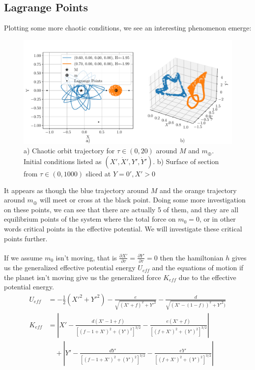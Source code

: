 \documentclass[11pt]{article}
\begin{document}
\subsection{Lagrange Points}
Plotting some more chaotic conditions, we see an interesting phenomenon emerge:
\begin{figure}[H]
    \centering
    \includegraphics[width=0.9\linewidth]{figures/chaotic_investigation_orbit.pdf}
    \caption{a) Chaotic orbit trajectory for $\tau \in (0, 20)$ around $M$ and $m_\oplus$. Initial conditions listed as $(X', \dot X', Y', \dot Y')$. b) Surface of section from $\tau \in (0, 1000)$ sliced at $Y=0', X'>0$}
    \label{fig:chaotic-investigation}
\end{figure}
\noindent
It appears as though the blue trajectory around $M$ and the orange trajectory around $m_\oplus$  will meet or cross at the black point. Doing some more investigation on these points, we can see that there are actually 5 of them, and they are all equilibrium points of the system where the total force on $m_0 = 0$, or in other words critical points in the effective potential. We will investigate these critical points further. 
\\
\\
\noindent If we assume $m_0$ isn't moving, that is $\frac{\partial X'}{\partial \tau} = \frac{\partial Y'}{\partial \tau} = 0$ then the hamiltonian $h$ gives us the generalized effective potential energy $U_{eff}$ and the equations of motion if the planet isn't moving give us the generalized force $K_{eff}$ due to the effective potential energy.
\begin{align}
    U_{eff} &= - \frac{1}{2} (X'^2 + Y'^2)   - \frac{e}{\sqrt{(X'+f)^2 + Y'^2}} - \frac{d}{\sqrt{(X'-(1-f))^2 + Y'^2)}} \\
    K_{eff} &= \left|X' - \frac{d (X'-1+f)}{[(f-1+X')^2 +(Y') ^2]^{3/2}} -\frac{e (X'+f)}{[(f+X')^2 +(Y') ^2]^{3/2}}\right| \nonumber \\
    & \quad + \left|Y' - \frac{d Y'}{[(f-1+X')^2 +(Y') ^2]^{3/2}} -\frac{e Y'}{[(f+X')^2 +(Y') ^2]^{3/2}}\right|
\end{align}
\end{document}
